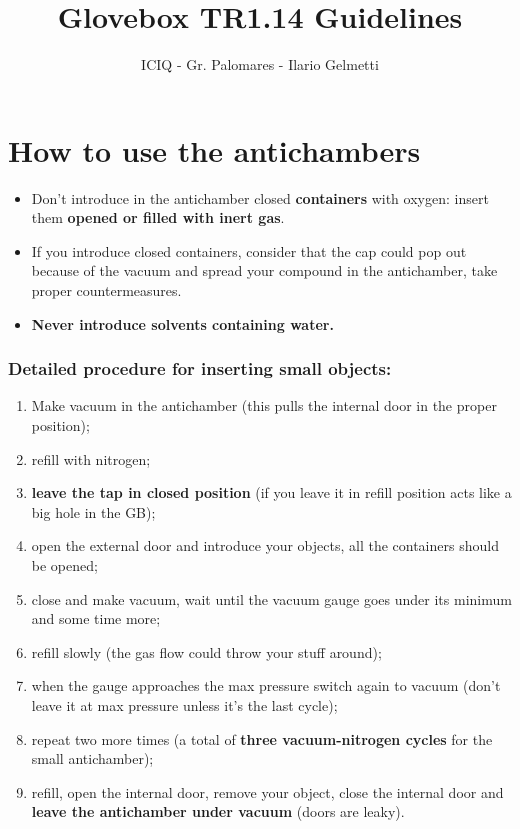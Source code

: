 \documentclass[a4paper,15pt]{scrartcl}
\title{Glovebox TR1.14 Guidelines}
\subtitle{}
\author{ICIQ - Gr. Palomares - Ilario Gelmetti}
\date{}
\begin{document}
\maketitle

\section*{How to use the antichambers}
\begin{itemize}
	\item     Don't introduce in the antichamber closed \textbf{containers} with oxygen: insert them \textbf{opened or filled with inert gas}.
	\item     If you introduce closed containers, consider that the cap could pop out because of the vacuum and spread your compound in the antichamber, take proper countermeasures.
	\item     \textbf{Never introduce solvents containing water.}
\end{itemize}
\subsubsection*{Detailed procedure for inserting small objects:}
\begin{enumerate}
	\item     Make vacuum in the antichamber (this pulls the internal door in the proper position);
	\item     refill with nitrogen;
	\item     \textbf{leave the tap in closed position} (if you leave it in refill position acts like a big hole in the GB);
	\item     open the external door and introduce your objects, all the containers should be opened;
	\item     close and make vacuum, wait until the vacuum gauge goes under its minimum and some time more;
	\item     refill slowly (the gas flow could throw your stuff around);
	\item     when the gauge approaches the max pressure switch again to vacuum (don't leave it at max pressure unless it's the last cycle);
	\item     repeat two more times (a total of \textbf{three vacuum-nitrogen cycles} for the small antichamber);
	\item     refill, open the internal door, remove your object, close the internal door and \textbf{leave the antichamber under vacuum} (doors are leaky).
\end{enumerate}
\end{document}
